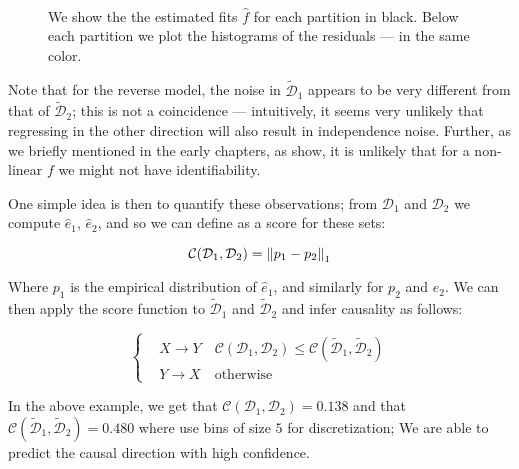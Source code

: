 \begin{figure}[H]
    \captionsetup[subfigure]{labelformat=empty}
    \centering
    \\


    \caption{  We show the the estimated fits $\hat{f}$ for each partition in black. Below each 
    partition we plot the histograms of the residuals ---  in the same color. }
    \label{fig:algo_fit}
\end{figure}

Note that for the reverse model, the noise in $\mathcal{\tilde{D}}_1$ appears to be very different from 
that of $\mathcal{\tilde{D}}_2$; this is not a coincidence ---  intuitively, it seems very unlikely that 
regressing in the other direction will also result in independence noise. Further, as we briefly 
mentioned in the early chapters, as \cite{hoyer2009nonlinear} show, it is unlikely that for a non-linear $f$
we might not have identifiability. 

One simple idea is then to quantify these observations; from $\mathcal{D}_1$ and $\mathcal{D}_2$ we 
compute $\hat{e}_1$, $\hat{e}_2$, and so we can define as a score for these sets:

$$
     \mathcal{C}(\mathcal{D}_1, \mathcal{D}_2) = \left\lVert p_1 - p_2\right\rVert_1
$$

Where $p_1$ is the empirical distribution of $\hat{e}_1$, and similarly for $p_2$ and $\hat{e}_2$. We 
can then apply the score function to $\mathcal{\tilde{D}}_1$ and $\mathcal{\tilde{D}}_2$ and 
infer causality as follows:

\[ 
     \begin{cases} 
        & X \rightarrow Y \quad  \mathcal{C}(\mathcal{D}_1, \mathcal{D}_2) 
        \leq \mathcal{C}(\mathcal{\tilde{D}}_1, \mathcal{\tilde{D}}_2) \\
        & Y \rightarrow X \quad \text{otherwise}
     \end{cases}
\]

In the above example, we get that $\mathcal{C}(\mathcal{D}_1, \mathcal{D}_2) = 0.138$ and that
$\mathcal{C}(\mathcal{\tilde{D}}_1, \mathcal{\tilde{D}}_2) = 0.480$ where use bins of size $5$ 
for discretization; We are able to predict the causal direction with high confidence.

